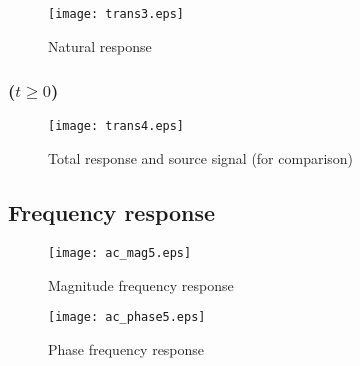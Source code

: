 \begin{figure}[H]
  \centering
  \texttt{[image: trans3.eps]}
  \caption{Natural response}
  \label{fig:nat_sim}
\end{figure}

\subsubsection{($ t \geq 0$)}

\begin{figure}[H]
  \centering
  \texttt{[image: trans4.eps]}
  \caption{Total response and source signal (for comparison)}
  \label{fig:tot:sim}
\end{figure}

\subsection{Frequency response}

\begin{figure}[H]
  \centering
  \texttt{[image: ac\_mag5.eps]}
  \caption{Magnitude frequency response}
  \label{freq_resp_mag_sim}
\end{figure}

\begin{figure}[H]
  \centering
  \texttt{[image: ac\_phase5.eps]}
  \caption{Phase frequency response}
  \label{freq_resp_pha_sim}
\end{figure}
